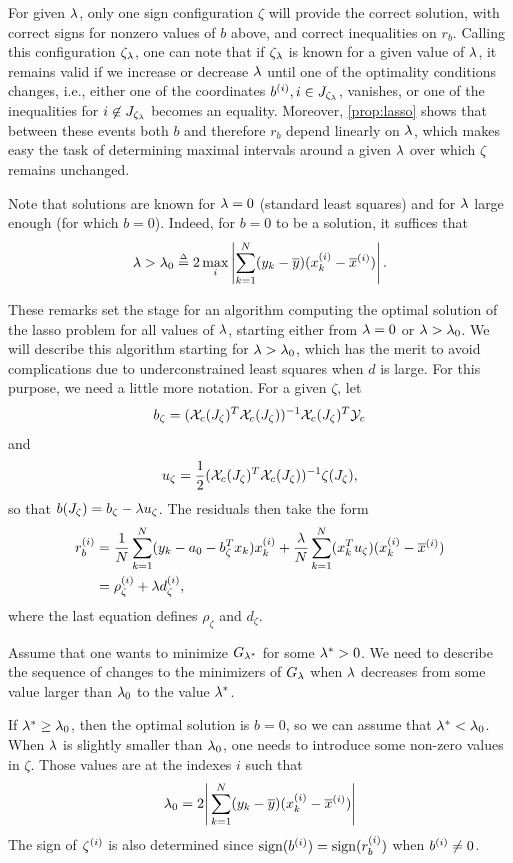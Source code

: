 For given $\lambda$, only one sign configuration $\zeta$ will provide the correct solution, with correct signs for nonzero values of $b$ above, and correct inequalities on $r_{b}$. Calling this configuration $\zeta_{\lambda}$, one can note that
if $\zeta_\lambda$ is known for a given value of $\lambda$, it  remains valid if we  increase or decrease $\lambda$ until one of the optimality conditions changes, i.e., either one of the coordinates $b^{(i)}, i\in J_{\zeta_\lambda}$, vanishes, or one of the inequalities  for $i\not \in J_{\zeta_\lambda}$ becomes an equality. Moreover, 
\cref{prop:lasso} shows that between these events both $b$ and therefore $r_{b}$ depend linearly on $\lambda$, which makes easy the task of determining maximal intervals around a given $\lambda$ over which $\zeta$ remains unchanged.

Note that solutions are known for $\lambda=0$ (standard least squares) and for $\lambda$ large enough (for which $b=0$).
Indeed, for $b=0$ to be a solution, it suffices that
\[
\lambda > \lambda_{0} \stackrel{{\scriptscriptstyle \Delta}}{=} 2 \max_{i} \left|\sum_{k=1}^N (y_k -\overline{y})
(x_k^{(i)} -\overline{x}^{(i)})\right|.
\]

These remarks set the stage for an algorithm computing the optimal solution of the lasso problem for all values of $\lambda$, starting either from $\lambda=0$ or $\lambda > \lambda_0$. We will describe this algorithm starting for $\lambda>\lambda_0$, which has the merit to avoid complications due to underconstrained least squares when $d$ is large. For this purpose, we need a little more  notation.
For a given $\zeta$, let
\[
b_\zeta = ({\mathcal X}_c(J_\zeta)^T{\mathcal X}_c(J_\zeta))^{-1} {\mathcal X}_c(J_\zeta)^T{\mathcal Y}_c
\]
and 
\[
u_\zeta = \frac12  ({\mathcal X}_c(J_\zeta)^T{\mathcal X}_c(J_\zeta))^{-1} \zeta(J_\zeta),
\]
so that $b(J_\zeta) = b_\zeta - \lambda u_\zeta$. 
The residuals then take the form
\[
\begin{aligned}
r_{b}^{(i)} &= \frac1 N \sum_{k=1}^N (y_k - {a_0} - b_\zeta^Tx_k) x_k^{(i)} + \frac{\lambda} N \sum_{k=1}^N (x_k^T u_\zeta)
(x_k^{(i)} -\overline{x}^{(i)}) \\
&= \rho_{\zeta}^{(i)} + \lambda d_{\zeta}^{(i)},
\end{aligned}
\]
where the last equation defines $\rho_\zeta$ and $d_\zeta$. 

Assume that one wants to minimize 
$G_{\lambda^*}$ for some $\lambda^* > 0$. We need to describe the sequence of changes to the minimizers of $G_\lambda$ when $\lambda$ decreases from some value larger than $\lambda_0$ to the value $\lambda^*$. 

If $\lambda^*\geq \lambda_0$, then the optimal solution is $b=0$, so we can assume that $\lambda^* < \lambda_0$. 
When $\lambda$ is slightly smaller than $\lambda_{0}$, one needs to introduce some non-zero values in $\zeta$.
Those values are at the indexes $i$ such that  
\[
\lambda_{0} = 2 \Bigg|\sum_{k=1}^N (y_k -\overline{y})
(x_k^{(i)} - \overline{x}^{(i)})\Bigg|
\]
The sign of $\zeta^{(i)}$ is also determined since $\mathrm{sign}(b^{(i)}) = \mathrm{sign}(r_{b}^{(i)})$ when $b^{(i)}\neq 0$.


